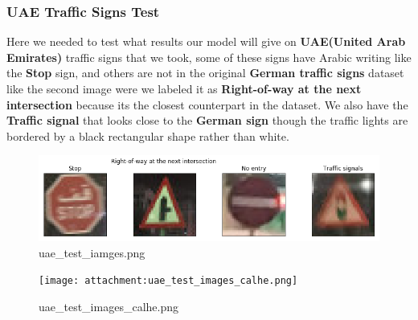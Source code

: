 \documentclass[11pt]{article}
\makeatletter
\def\maxwidth{\ifdim\Gin@nat@width>\linewidth\linewidth
    \else\Gin@nat@width\fi}
\let\Oldincludegraphics\includegraphics
\renewcommand{\includegraphics}[1]{\Oldincludegraphics[width=.8\maxwidth]{#1}}
\makeatother
\begin{document}
    \hypertarget{uae-traffic-signs-test}{%
\subsubsection{UAE Traffic Signs Test}\label{uae-traffic-signs-test}}

Here we needed to test what results our model will give on
\textbf{UAE(United Arab Emirates)} traffic signs that we took, some of
these signs have Arabic writing like the \textbf{Stop} sign, and others
are not in the original \textbf{German traffic signs} dataset like the
second image were we labeled it as \textbf{Right-of-way at the next
intersection} because its the closest counterpart in the dataset. We
also have the \textbf{Traffic signal} that looks close to the
\textbf{German sign} though the traffic lights are bordered by a black
rectangular shape rather than white.

\begin{figure}
\centering
\includegraphics{./assets/uae_test_iamges.png}
\caption{uae\_test\_iamges.png}
\end{figure}

\begin{figure}
\centering
\texttt{[image: attachment:uae\_test\_images\_calhe.png]}
\caption{uae\_test\_images\_calhe.png}
\end{figure}
\end{document}
